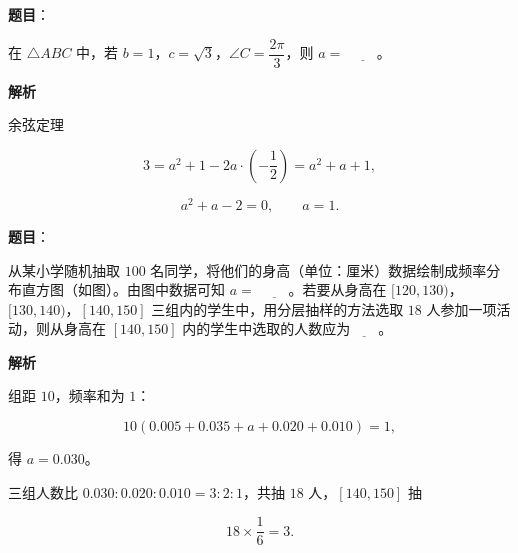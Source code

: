 \begin{answer}

\textbf{题目}：

在 $\triangle ABC$ 中，若 $b=1$，$c=\sqrt3$，$\angle C=\dfrac{2\pi}3$，则 $a=$ $\underline{\qquad}$。

\textbf{解析}

余弦定理

\nopagebreak[4]
\[3=a^2+1-2a\cdot\left(-\frac12\right)=a^2+a+1,\]

\nopagebreak[4]
\[a^2+a-2=0,\qquad a=1.\]


\end{answer}
\begin{answer}

\textbf{题目}：

从某小学随机抽取 $100$ 名同学，将他们的身高（单位：厘米）数据绘制成频率分布直方图（如图）。由图中数据可知 $a=$ $\underline{\qquad}$。若要从身高在 $[120,130)$，$[130,140)$，$[140,150]$ 三组内的学生中，用分层抽样的方法选取 $18$ 人参加一项活动，则从身高在 $[140,150]$ 内的学生中选取的人数应为$\underline{\qquad}$。
\nopagebreak[4]
\begin{center}\end{center}
\nopagebreak[4]
\textbf{解析}

组距 $10$，频率和为 $1$：

\nopagebreak[4]
\[10(0.005+0.035+a+0.020+0.010)=1,\]

得 $a=0.030$。

三组人数比 $0.030:0.020:0.010=3:2:1$，共抽 $18$ 人，$[140,150]$ 抽

\nopagebreak[4]
\[18\times\frac16=3.\]


\end{answer}
